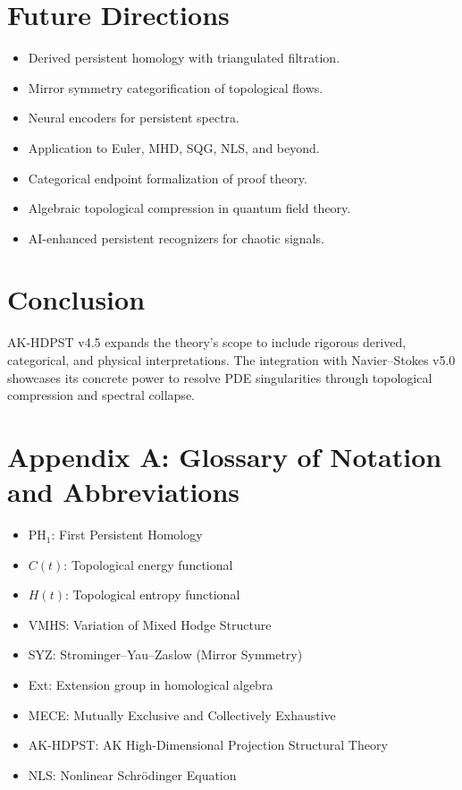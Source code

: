 \documentclass[11pt]{article}
\begin{document}
\section{Future Directions}

\begin{itemize}
    \item Derived persistent homology with triangulated filtration.
    \item Mirror symmetry categorification of topological flows.
    \item Neural encoders for persistent spectra.
    \item Application to Euler, MHD, SQG, NLS, and beyond.
    \item Categorical endpoint formalization of proof theory.
    \item Algebraic topological compression in quantum field theory.
    \item AI-enhanced persistent recognizers for chaotic signals.
\end{itemize}

\section{Conclusion}
AK-HDPST v4.5 expands the theory’s scope to include rigorous derived, categorical, and physical interpretations. The integration with Navier--Stokes v5.0 showcases its concrete power to resolve PDE singularities through topological compression and spectral collapse.

\appendix

\section*{Appendix A: Glossary of Notation and Abbreviations}
\begin{itemize}
    \item PH$_1$: First Persistent Homology
    \item $C(t)$: Topological energy functional
    \item $H(t)$: Topological entropy functional
    \item VMHS: Variation of Mixed Hodge Structure
    \item SYZ: Strominger–Yau–Zaslow (Mirror Symmetry)
    \item Ext: Extension group in homological algebra
    \item MECE: Mutually Exclusive and Collectively Exhaustive
    \item AK-HDPST: AK High-Dimensional Projection Structural Theory
    \item NLS: Nonlinear Schrödinger Equation
\end{itemize}
\end{document}
